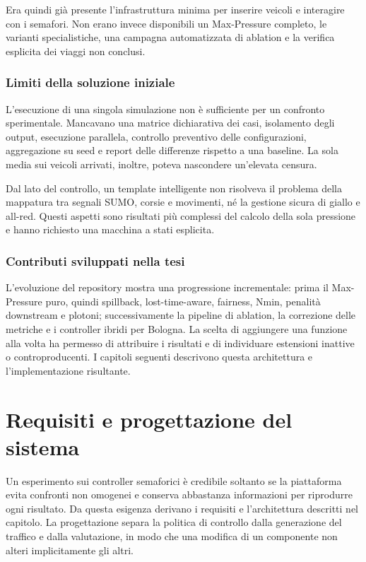 \documentclass[12pt,a4paper,oneside]{report}
\numberwithin{equation}{chapter}
\begin{document}
Era quindi già presente l'infrastruttura minima per inserire veicoli e
interagire con i semafori. Non erano invece disponibili un Max-Pressure
completo, le varianti specialistiche, una campagna automatizzata di ablation e
la verifica esplicita dei viaggi non conclusi.

\subsection{Limiti della soluzione iniziale}

L'esecuzione di una singola simulazione non è sufficiente per un confronto
sperimentale. Mancavano una matrice dichiarativa dei casi, isolamento degli
output, esecuzione parallela, controllo preventivo delle configurazioni,
aggregazione su seed e report delle differenze rispetto a una baseline. La
sola media sui veicoli arrivati, inoltre, poteva nascondere un'elevata censura.

Dal lato del controllo, un template intelligente non risolveva il problema
della mappatura tra segnali SUMO, corsie e movimenti, né la gestione sicura di
giallo e all-red. Questi aspetti sono risultati più complessi del calcolo della
sola pressione e hanno richiesto una macchina a stati esplicita.

\subsection{Contributi sviluppati nella tesi}

L'evoluzione del repository mostra una progressione incrementale: prima il
Max-Pressure puro, quindi spillback, lost-time-aware, fairness, Nmin, penalità
downstream e plotoni; successivamente la pipeline di ablation, la correzione
delle metriche e i controller ibridi per Bologna. La scelta di aggiungere una
funzione alla volta ha permesso di attribuire i risultati e di individuare
estensioni inattive o controproducenti. I capitoli seguenti descrivono questa
architettura e l'implementazione risultante.

\chapter{Requisiti e progettazione del sistema}
\label{chap:progettazione}

Un esperimento sui controller semaforici è credibile soltanto se la piattaforma
evita confronti non omogenei e conserva abbastanza informazioni per
riprodurre ogni risultato. Da questa esigenza derivano i requisiti e
l'architettura descritti nel capitolo. La progettazione separa la politica di
controllo dalla generazione del traffico e dalla valutazione, in modo che una
modifica di un componente non alteri implicitamente gli altri.
\end{document}
